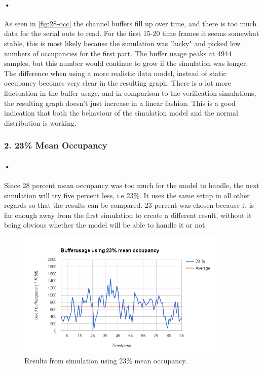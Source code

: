 \documentclass[a4paper, 12pt]{report}
\begin{document}
\paragraph{•}
As seen in \ref{fig:28-occ} the channel buffers fill up over time, and there is too much data for the serial outs to read.
For the first 15-20 time frames it seems somewhat stable, this is most likely because the simulation was "lucky" and picked low numbers of occupancies for the first part.
The buffer usage peaks at 4944 samples, but this number would continue to grow if the simulation was longer.
The difference when using a more realistic data model, instead of static occupancy becomes very clear in the resulting graph.
There is a lot more fluctuation in the buffer usage, and in comparison to the verification simulations, the resulting graph doesn't just increase in a linear fashion.
This is a good indication that both the behaviour of the simulation model and the normal distribution is working.


\subsubsection{2. 23\% Mean Occupancy}

\paragraph{•}
Since 28 percent mean occupancy was too much for the model to handle, the next simulation will try five percent less, i.e 23\%.
It uses the same setup in all other regards so that the results can be compared.
23 percent was chosen because it is far enough away from the first simulation to create a different result, without it being obvious whether the model will be able to handle it or not.

\begin{figure}[h!]
	\centering
		\includegraphics[width=0.9\textwidth]{images/23-occ.png}
		\caption{Results from simulation using 23\% mean occupancy.}
		\label{fig:23-occ}
\end{figure}
\end{document}
